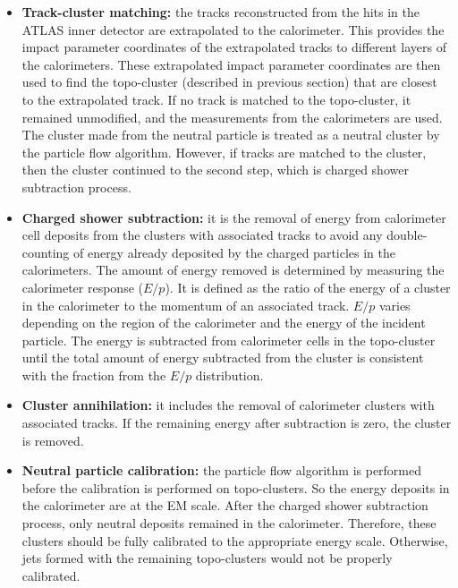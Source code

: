 \begin{itemize}
	\item \textbf{Track-cluster matching:} the tracks reconstructed from the hits in the ATLAS inner detector are extrapolated to the calorimeter. This provides the impact parameter coordinates of the extrapolated tracks to different layers of the calorimeters. These extrapolated impact parameter coordinates are then used to find the topo-cluster (described in previous section) that are closest to the extrapolated track. If no track is matched to the topo-cluster, it remained unmodified, and the measurements from the calorimeters are used. The cluster made from the neutral particle is treated as a neutral cluster by the particle flow algorithm. However, if tracks are matched to the cluster, then the cluster continued to the second step, which is charged shower subtraction process.~\cite{pflow}
	
	\item \textbf{Charged shower subtraction:} it is the removal of energy from calorimeter cell deposits from the clusters with associated tracks to avoid any double-counting of energy already deposited by the charged particles in the calorimeters. The amount of energy removed is determined by measuring the calorimeter response ($E/p$). It is defined as the ratio of the energy of a cluster in the calorimeter to the momentum of an associated track. $E/p$ varies depending on the region of the calorimeter and the energy of the incident particle. The energy is subtracted from calorimeter cells in the topo-cluster until the total amount of energy subtracted from the cluster is consistent with the fraction from the $E/p$ distribution.~\cite{pflow} 
	
	\item \textbf{Cluster annihilation:} it includes the removal of calorimeter clusters with associated tracks. If the remaining energy after subtraction is zero, the cluster is removed.
	
	\item \textbf{Neutral particle calibration:} the particle flow algorithm is performed before the calibration is performed on topo-clusters. So the energy deposits in the calorimeter are at the EM scale. After the charged shower subtraction process, only neutral deposits remained in the calorimeter. Therefore, these clusters should be fully calibrated to the appropriate energy scale. Otherwise, jets formed with the remaining topo-clusters would not be properly calibrated.
	
\end{itemize}


